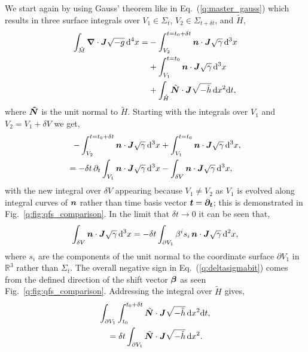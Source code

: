 We start again by using Gauss' theorem like in Eq.~(\ref{q:master_gauss}) which results in three surface integrals over $V_1\in\Sigma_t$, $V_2\in\Sigma_{t+\delta t}$, and $\tilde{H}$,
\begin{align} \begin{split}
\int_{\tilde{M}} \boldsymbol{\nabla} \cdot \boldsymbol{J} \sqrt{-g} \, \dd^4 x =& -\int^{t=t_0+\delta t}_{V_2} \boldsymbol{n} \cdot \boldsymbol{J} \sqrt{\gamma} \,\dd^3 x \\
                                                             & +\int^{t=t_0}_{V_1} \boldsymbol{n} \cdot \boldsymbol{J} \sqrt{\gamma} \,\dd^3 x \\
                                                             & +\int_{\tilde{H}} \tilde{\boldsymbol N} \cdot \boldsymbol{J} \sqrt{-\tilde{h}} \, \dd x^2 \dd t,
\end{split}\end{align}
where $\boldsymbol{\tilde{N}}$ is the unit normal to $\tilde{H}$. Starting with the integrals over $V_1$ and $V_2 = V_1 + \delta V$ we get,
\begin{align}
-\int^{t=t_0+\delta t}_{V_2} \boldsymbol{n} \cdot \boldsymbol{J} \sqrt{\gamma} \,\dd^3 x  &+\int^{t=t_0}_{V_1} \boldsymbol{n} \cdot \boldsymbol{J} \sqrt{\gamma} \,\dd^3 x, \\
 \label{q:dsigma dt bit}=-\delta t \,\partial_t \int_{V_1} \boldsymbol{n} \cdot \boldsymbol{J} \sqrt{\gamma} \,\dd^3 x  &-\int_{\delta V} \boldsymbol{n} \cdot \boldsymbol{J} \sqrt{\gamma} \,\dd^3 x,
\end{align}
with the new integral over $\delta V$ appearing because $V_1\neq V_2$ as $V_1$ is evolved along integral curves of $\boldsymbol{n}$ rather than time basis vector $\boldsymbol{t}=\boldsymbol{\partial_t}$; this is demonstrated in Fig.~\ref{q:fig:qfs_comparison}. In the limit that $\delta t \rightarrow 0$ it can be seen that,
\begin{align} \label{q:deltasigmabit}
\int_{\delta V} \boldsymbol{n} \cdot \boldsymbol{J} \sqrt{\gamma} \,\dd^3 x = -\delta t \int_{\partial V_1} \beta^i s_i\, \boldsymbol{n} \cdot \boldsymbol{J} \sqrt{\gamma} \,\dd^2 x,
\end{align}
where $s_i$ are the components of the unit normal to the coordinate surface $\partial V_1$ in $\mathbb{R}^3$ rather than $\Sigma_t$. The overall negative sign in Eq.~(\ref{q:deltasigmabit}) comes from the defined direction of the shift vector $\boldsymbol{\beta}$ as seen Fig.~\ref{q:fig:qfs_comparison}. Addressing the integral over $\tilde{H}$ gives,
\begin{align}
 \int_{\partial V_1}\int_{t_0}^{t_0 + \delta t}\tilde{\boldsymbol N} &\cdot \boldsymbol{J} \sqrt{-\tilde{h}} \, \dd x^2 \dd t, \nonumber \\
 \label{q:htildepart}=\delta t \int_{\partial V_1} \tilde{\boldsymbol N} &\cdot \boldsymbol{J} \sqrt{-\tilde{h}} \, \dd x^2.
\end{align}
